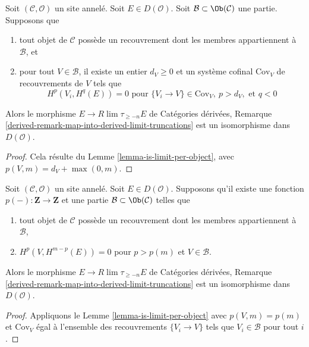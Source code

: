 \begin{lemma}
\label{lemma-is-limit-spaltenstein}
Soit $(\mathcal{C}, \mathcal{O})$ un site annelé. Soit
$E \in D(\mathcal{O})$. Soit $\mathcal{B} \subset \Ob(\mathcal{C})$ une
partie. Supposons que
\begin{enumerate}
\item tout objet de $\mathcal{C}$ possède un recouvrement dont les membres
appartiennent à $\mathcal{B}$, et
\item pour tout $V \in \mathcal{B}$, il existe un entier $d_V \geq 0$ et un
système cofinal $\text{Cov}_V$ de recouvrements de $V$ tels que
$$
H^p(V_i, H^q(E)) = 0 \text{ pour }
\{V_i \to V\} \in \text{Cov}_V,\ p > d_V, \text{ et }q < 0
$$
\end{enumerate}
Alors le morphisme $E \to R\lim \tau_{\geq -n} E$ de Catégories dérivées,
Remarque
\ref{derived-remark-map-into-derived-limit-truncations}
est un isomorphisme dans $D(\mathcal{O})$.
\end{lemma}

\begin{proof}
Cela résulte du Lemme \ref{lemma-is-limit-per-object}, avec
$p(V, m) = d_V + \max(0, m)$.
\end{proof}

\begin{lemma}
\label{lemma-is-limit}
Soit $(\mathcal{C}, \mathcal{O})$ un site annelé. Soit
$E \in D(\mathcal{O})$. Supposons qu'il existe une fonction
$p(-) : \mathbf{Z} \to \mathbf{Z}$ et une partie
$\mathcal{B} \subset \Ob(\mathcal{C})$ telles que
\begin{enumerate}
\item tout objet de $\mathcal{C}$ possède un recouvrement dont les membres
appartiennent à $\mathcal{B}$,
\item $H^p(V, H^{m - p}(E)) = 0$ pour $p > p(m)$ et
$V \in \mathcal{B}$.
\end{enumerate}
Alors le morphisme $E \to R\lim \tau_{\geq -n} E$ de Catégories dérivées,
Remarque
\ref{derived-remark-map-into-derived-limit-truncations}
est un isomorphisme dans $D(\mathcal{O})$.
\end{lemma}

\begin{proof}
Appliquons le Lemme \ref{lemma-is-limit-per-object} avec
$p(V, m) = p(m)$ et $\text{Cov}_V$ égal à l'ensemble des recouvrements
$\{V_i \to V\}$ tels que $V_i \in \mathcal{B}$ pour tout $i$.
\end{proof}

